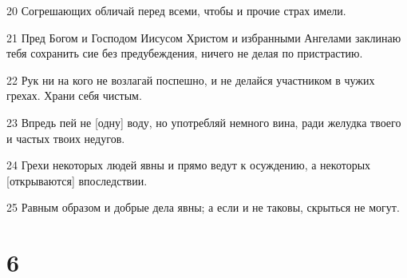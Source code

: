 \par 20 Согрешающих обличай перед всеми, чтобы и прочие страх имели.
\par 21 Пред Богом и Господом Иисусом Христом и избранными Ангелами заклинаю тебя сохранить сие без предубеждения, ничего не делая по пристрастию.
\par 22 Рук ни на кого не возлагай поспешно, и не делайся участником в чужих грехах. Храни себя чистым.
\par 23 Впредь пей не [одну] воду, но употребляй немного вина, ради желудка твоего и частых твоих недугов.
\par 24 Грехи некоторых людей явны и прямо ведут к осуждению, а некоторых [открываются] впоследствии.
\par 25 Равным образом и добрые дела явны; а если и не таковы, скрыться не могут.

\chapter{6}

